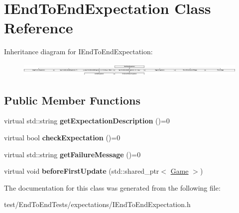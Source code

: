 \hypertarget{classIEndToEndExpectation}{}\section{I\+End\+To\+End\+Expectation Class Reference}
\label{classIEndToEndExpectation}
Inheritance diagram for I\+End\+To\+End\+Expectation\+:\begin{figure}[H]
\begin{center}
\leavevmode
\includegraphics[height=0.653951cm]{classIEndToEndExpectation}
\end{center}
\end{figure}
\subsection*{Public Member Functions}
\begin{DoxyCompactItemize}
\item 
virtual std\+::string {\bfseries get\+Expectation\+Description} ()=0\hypertarget{classIEndToEndExpectation_a50719797f203d30987cc82835d6fc785}{}\label{classIEndToEndExpectation_a50719797f203d30987cc82835d6fc785}

\item 
virtual bool {\bfseries check\+Expectation} ()=0\hypertarget{classIEndToEndExpectation_afba5cd79bed75f29f6ed4a41f94ba8d0}{}\label{classIEndToEndExpectation_afba5cd79bed75f29f6ed4a41f94ba8d0}

\item 
virtual std\+::string {\bfseries get\+Failure\+Message} ()=0\hypertarget{classIEndToEndExpectation_a7efc089699c94cd9f3463363ff25f9b1}{}\label{classIEndToEndExpectation_a7efc089699c94cd9f3463363ff25f9b1}

\item 
virtual void {\bfseries before\+First\+Update} (std\+::shared\+\_\+ptr$<$ \hyperlink{classGame}{Game} $>$)\hypertarget{classIEndToEndExpectation_a74f22c283e4f7f3d41c2a0b612dab376}{}\label{classIEndToEndExpectation_a74f22c283e4f7f3d41c2a0b612dab376}

\end{DoxyCompactItemize}


The documentation for this class was generated from the following file\+:\begin{DoxyCompactItemize}
\item 
test/\+End\+To\+End\+Tests/expectations/I\+End\+To\+End\+Expectation.\+h\end{DoxyCompactItemize}
